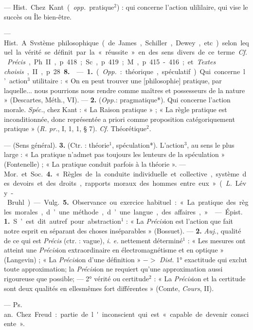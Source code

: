 \begin{itemize}[leftmargin=1cm, label=, itemsep=1pt]
 — \si{Hist.} Chez Kant ({\it opp.}
pratique$^2$) : qui concerne l'action
ulililaire, qui vise le succès ou Île
bien-être.

 — \si{Hist.} A. Svstème
philosophique (de James, Schiller,
Dewey, etc.) selon lequel la vérité
se définit par la « réussite » en des
sens divers de ce terme. {\it Cf.} {\it Précis},
Ph. II, p. 418; Sc., p. 419; M.,
p. 415-416; et {\it Textes choisis}, II,
p. 28 {\bf 8.}

 — {\bf 1.} ({\it Opp.} : théorique,
spéculatif). Qui concerne l’action$^3$
utilitaire : « On en peut trouver une
[philosophie] pratique, par laquelle...
nous pourrions nous rendre comme
maîtres et possesseurs de la nature »
(Descartes, Méth., VI). — {\bf 2.} ({\it Opp.}:
pragmatique*). Qui concerne l’action
morale. {\it Spéc.}, chez Kant : « La Raison
pratique » ; « La règle pratique est
inconditionnée, donc représentée a
priori comme proposition catégoriquement pratique » ({\it R. pr.}, I, 1,
1, § 7). {\it Cf.} Théorétique$^2$.

 — (Sens général).
 {\bf 3.} (Ctr. : théorie$^1$, spéculation*).
L'action$^3$, au sens le plus large : « La
pratique n’admet pas toujours les
lenteurs de la spéculation » (Fontenelle) ; « La pratique conduit parfois
à la théorie ». — \si{Mor.} et \si{Soc.} {\bf 4.}
« Règles de la conduite individuelle
et collective, système des devoirs et
des droits, rapports moraux des
hommes entre eux » ({\it L.} Lévy-Bruhl). — \si{Vulg.} {\bf 5.} Observance ou
exercice habituel : « La pratique
des règles morales, d’une méthode,
d’une langue, des affaires, »

 — \si{Épist.} {\bf 1.} S’est dit autref.
pour abstraction$^1$ : « La {\it Précis}ion
est l’action que fait notre esprit en
séparant des choses inséparables »
(Bossuet). — {\bf 2.} {\it Auj.}, qualité de ce
qui est {\it Précis} (ctr. : vague), {\it i. e.} nettement déterminé$^1$ : « Les mesures
ont atteint une {\it Précis}ion extraordinaire en électromagnétisme et en
optique » (Langevin) ; « La {\it Précis}ion
d'une définition » $->$ {\it Dist.}
1° exactitude qui exclut toute approximation; la {\it Précis}ion ne requiert
qu’une approximation aussi rigoureuse que possible; — 2° vérité ou
certitude$^2$ : « La {\it Précis}ion et la certitude sont deux qualités en ellesmêmes fort différentes » (Comte,
{\it Cours}, II).

 — \si{Ps. an.} Chez Freud :
partie de l'inconscient qui est « capable de devenir consciente ».


\end{itemize}
